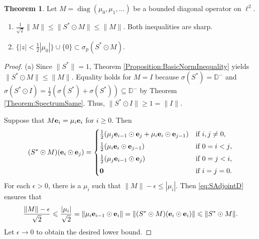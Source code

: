 \documentclass[10pt,reqno]{amsart}
\newcommand{\0}{{\color{lightgray}0}}
\newcommand{\D}{\mathbb{D}}
\renewcommand{\leq}{\leqslant}
\renewcommand{\geq}{\geqslant}
\newcommand{\diag}{\operatorname{diag}}
\newcommand{\norm}[1]{\| #1 \|}
\renewcommand{\vec}[1]{{\bf #1}}
\theoremstyle{definition}
\newtheorem{Theorem}[equation]{Theorem}
\numberwithin{equation}{section}
\begin{document}




\begin{Theorem}\label{Theorem:DiagBackShift}
Let $M = \diag(\mu_0,\mu_1,\ldots)$ be a bounded diagonal operator on $\ell^2$.
\begin{enumerate}
\item $\frac{1}{\sqrt{2}} \norm{M} \leq \norm{S^* \odot M} \leq \| M \|$. Both inequalities are sharp.
\item $\{ |z| < \frac{1}{2}|\mu_0| \} \cup \{0\}\subset \sigma_{\textrm{p}} ( S^* \odot M ) $.
\end{enumerate}
\end{Theorem}

\begin{proof}
(a) Since $\|S^*\| = 1$, Theorem \ref{Proposition:BasicNormInequality} yields $\norm{S^* \odot M} \leq \| M \|$.
Equality holds for $M= I$ because $\sigma(S^*) = \D^-$ \cite[Prop.~5.2.4.a]{OTBE} and
$\sigma(S^*\odot I) = \frac{1}{2}(\sigma(S^*)+\sigma(S^*)) \subseteq \D^-$
by Theorem \ref{Theorem:SpectrumSame}.  Thus, $\norm{S^* \odot I} \geq 1 = \norm{I}$.

Suppose that $M \vec{e}_i = \mu_i \vec{e}_i$ for $i\geq 0$.  Then
\begin{equation}\label{eq:SAdjointD}
    (S^* \odot M) (\vec{e}_i \odot \vec{e}_j)
    =
    \begin{cases}
    \frac{1}{2}( \mu_j \vec{e}_{i-1}\odot \vec{e}_j+\mu_i \vec{e}_i\odot \vec{e}_{j-1} ) & \text{if $i,j\neq 0$},\\[3pt]
    \frac{1}{2}( \mu_i \vec{e}_i\odot \vec{e}_{j-1} ) & \text{if $0 = i < j$},\\[3pt]
    \frac{1}{2}( \mu_j \vec{e}_{i-1}\odot \vec{e}_j  ) & \text{if $0=j<i$},\\[3pt]
     \vec{0} & \text{if $i=j=0$}.
    \end{cases}
\end{equation}
For each $\epsilon>0$, there is a $\mu_i$ such that
$\norm{M}-\epsilon \leq |\mu_i|$. 
Then \eqref{eq:SAdjointD} ensures that
\begin{equation}\label{eq:CompAbove}
 \frac{\norm{M}-\epsilon}{\sqrt{2}}\leq     \frac{| \mu_i |}{\sqrt{2}} =\| \mu_i \vec{e}_{i-1} \odot \vec{e}_{i} \| = \| (S^*\odot M)( \vec{e}_{i} \odot \vec{e}_{i}) \| \leqslant  \norm{S^* \odot M}.
\end{equation}
Let $\epsilon\to 0$ to obtain the desired lower bound.


\end{proof}
\end{document}
